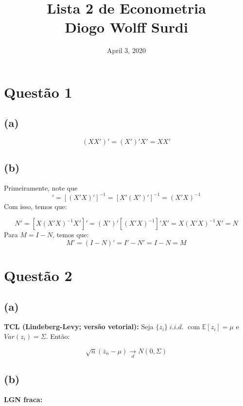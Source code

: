 \documentclass[12pt]{article}
\title{Lista 2 de Econometria\\
Diogo Wolff Surdi}
\date{April 3, 2020}
\begin{document}
\maketitle

\section*{Questão 1}

\subsection*{(a)}
\begin{equation*}
(XX')'=(X')'X'=XX'
\end{equation*}

\subsection*{(b)}
Primeiramente, note que
\begin{equation*}
[(X'X)^{-1}]'=[(X'X)']^{-1}=[X'(X')']^{-1}=(X'X)^{-1}
\end{equation*}
Com isso, temos que:

\begin{equation*}
N'=[X(X'X)^{-1}X']'=(X')'[(X'X)^{-1}]'X'=X(X'X)^{-1}X'=N
\end{equation*}
Para $M=I-N$, temos que:
\begin{equation*}
M'=(I-N)'=I'-N'=I-N=M
\end{equation*}

\section*{Questão 2}

\subsection*{(a)}
\textbf{TCL (Lindeberg-Levy; versão vetorial):} Seja $\{z_{i}\} \; i.i.d. \;$ com $\mathbb{E}[z_{i}]=\mu$ e $Var(z_{i})=\Sigma$. Então:

\begin{equation*}
\sqrt{n}(\bar{z}_{n}-\mu) \xrightarrow[d]{} N(0,\Sigma)
\end{equation*}

\subsection*{(b)}
\textbf{LGN fraca:}
\end{document}
